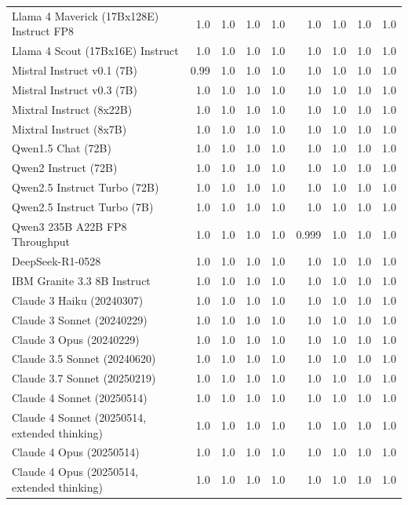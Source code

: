 \begin{table}[htp]
{\begin{tabular}{lrrrrrrrr}
Llama 4 Maverick (17Bx128E) Instruct FP8 & 1.0 & 1.0 & 1.0 & 1.0 & 1.0 & 1.0 & 1.0 & 1.0 \\
Llama 4 Scout (17Bx16E) Instruct & 1.0 & 1.0 & 1.0 & 1.0 & 1.0 & 1.0 & 1.0 & 1.0 \\
Mistral Instruct v0.1 (7B) & 0.99 & 1.0 & 1.0 & 1.0 & 1.0 & 1.0 & 1.0 & 1.0 \\
Mistral Instruct v0.3 (7B) & 1.0 & 1.0 & 1.0 & 1.0 & 1.0 & 1.0 & 1.0 & 1.0 \\
Mixtral Instruct (8x22B) & 1.0 & 1.0 & 1.0 & 1.0 & 1.0 & 1.0 & 1.0 & 1.0 \\
Mixtral Instruct (8x7B) & 1.0 & 1.0 & 1.0 & 1.0 & 1.0 & 1.0 & 1.0 & 1.0 \\
Qwen1.5 Chat (72B) & 1.0 & 1.0 & 1.0 & 1.0 & 1.0 & 1.0 & 1.0 & 1.0 \\
Qwen2 Instruct (72B) & 1.0 & 1.0 & 1.0 & 1.0 & 1.0 & 1.0 & 1.0 & 1.0 \\
Qwen2.5 Instruct Turbo (72B) & 1.0 & 1.0 & 1.0 & 1.0 & 1.0 & 1.0 & 1.0 & 1.0 \\
Qwen2.5 Instruct Turbo (7B) & 1.0 & 1.0 & 1.0 & 1.0 & 1.0 & 1.0 & 1.0 & 1.0 \\
Qwen3 235B A22B FP8 Throughput & 1.0 & 1.0 & 1.0 & 1.0 & 0.999 & 1.0 & 1.0 & 1.0 \\
DeepSeek-R1-0528 & 1.0 & 1.0 & 1.0 & 1.0 & 1.0 & 1.0 & 1.0 & 1.0 \\
IBM Granite 3.3 8B Instruct & 1.0 & 1.0 & 1.0 & 1.0 & 1.0 & 1.0 & 1.0 & 1.0 \\
Claude 3 Haiku (20240307) & 1.0 & 1.0 & 1.0 & 1.0 & 1.0 & 1.0 & 1.0 & 1.0 \\
Claude 3 Sonnet (20240229) & 1.0 & 1.0 & 1.0 & 1.0 & 1.0 & 1.0 & 1.0 & 1.0 \\
Claude 3 Opus (20240229) & 1.0 & 1.0 & 1.0 & 1.0 & 1.0 & 1.0 & 1.0 & 1.0 \\
Claude 3.5 Sonnet (20240620) & 1.0 & 1.0 & 1.0 & 1.0 & 1.0 & 1.0 & 1.0 & 1.0 \\
Claude 3.7 Sonnet (20250219) & 1.0 & 1.0 & 1.0 & 1.0 & 1.0 & 1.0 & 1.0 & 1.0 \\
Claude 4 Sonnet (20250514) & 1.0 & 1.0 & 1.0 & 1.0 & 1.0 & 1.0 & 1.0 & 1.0 \\
Claude 4 Sonnet (20250514, extended thinking) & 1.0 & 1.0 & 1.0 & 1.0 & 1.0 & 1.0 & 1.0 & 1.0 \\
Claude 4 Opus (20250514) & 1.0 & 1.0 & 1.0 & 1.0 & 1.0 & 1.0 & 1.0 & 1.0 \\
Claude 4 Opus (20250514, extended thinking) & 1.0 & 1.0 & 1.0 & 1.0 & 1.0 & 1.0 & 1.0 & 1.0 \\

\end{tabular}}
\end{table}
